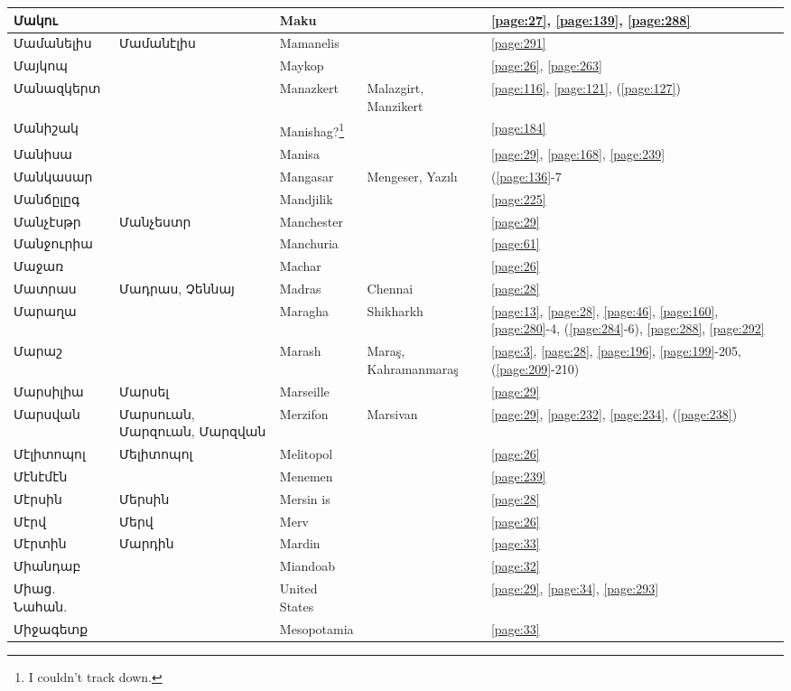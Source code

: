 \begin{center}
\begin{longtable}{|p{}|p{3cm}|p{3cm}|p{2cm}|p{3cm}|}
Մակու& & Maku& &\ref{page:27}, \ref{page:139}, \ref{page:288}\\ \hline
Մամանելիս& Մամանէլիս& Mamanelis& &\ref{page:291}\\ \hline
Մայկոպ& & Maykop& &\ref{page:26}, \ref{page:263}\\ \hline
Մանազկերտ& &Manazkert  & Malazgirt,  Manzikert &\ref{page:116}, \ref{page:121}, (\ref{page:127})\\ \hline
Մանիշակ& & Manishag?\footnote{I couldn't track down.}& &\ref{page:184}\\ \hline
Մանիսա& &Manisa & &\ref{page:29}, \ref{page:168}, \ref{page:239}\\ \hline
Մանկասար& & Mangasar  &Mengeser, Yazılı &(\ref{page:136}-7\\ \hline
Մանճըլըգ& &Mandjilik & &\ref{page:225}\\ \hline
Մանչէսթր&   Մանչեստր & Manchester& &\ref{page:29}\\ \hline
Մանջուրիա& &Manchuria & &\ref{page:61}\\ \hline
Մաջառ& & Machar&  &\ref{page:26}\\ \hline
Մատրաս& Մադրաս, Չեննայ& Madras& Chennai&\ref{page:28}\\ \hline
Մարաղա& & Maragha& Shikharkh&\ref{page:13}, \ref{page:28}, \ref{page:46}, \ref{page:160}, \ref{page:280}-4, (\ref{page:284}-6), \ref{page:288}, \ref{page:292}\\ \hline
Մարաշ& & Marash & Maraş, Kahramanmaraş  &\ref{page:3}, \ref{page:28}, \ref{page:196}, \ref{page:199}-205, (\ref{page:209}-210)\\ \hline
Մարսիլիա&Մարսել &Marseille & &\ref{page:29}\\ \hline
Մարսվան&Մարսուան, Մարզուան, Մարզվան &Merzifon &Marsivan  &\ref{page:29}, \ref{page:232}, \ref{page:234}, (\ref{page:238})\\ \hline
Մէլիտոպոլ&Մելիտոպոլ &Melitopol & &\ref{page:26}\\ \hline
Մէնէմէն& &Menemen & &\ref{page:239}\\ \hline
Մէրսին&Մերսին & Mersin is& &\ref{page:28}\\ \hline
Մէրվ& Մերվ&Merv & &\ref{page:26}\\ \hline
Մէրտին& Մարդին&Mardin & &\ref{page:33}\\ \hline
Միանդաբ& &Miandoab & &\ref{page:32}\\ \hline
Միաց. Նահան.& & United States& &\ref{page:29}, \ref{page:34}, \ref{page:293}\\ \hline
Միջագետք& &
Mesopotamia& &\ref{page:33}\\ \hline

\end{longtable}
\end{center}
